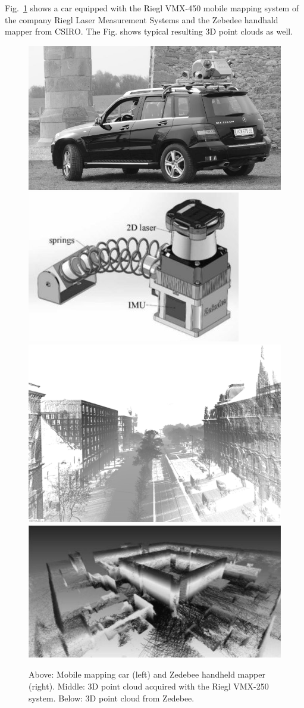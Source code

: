 \documentclass[twocolumn,oneside]{book}
\begin{document}
Fig.~\ref{fig:mm} shows a car equipped with the Riegl VMX-450 mobile
mapping system of the company Riegl Laser Measurement Systems and the
Zebedee handhald mapper from CSIRO. The Fig. shows typical resulting
3D point clouds as well.
%
\begin{figure}
  \centering
  \includegraphics[width=0.545\linewidth]{BOOKFIGS/riegl_car}
  \includegraphics[width=0.435\linewidth]{BOOKFIGS/zebedee}
  \includegraphics[width=0.95\linewidth]{BOOKFIGS/wien}
  \includegraphics[width=0.95\linewidth]{BOOKFIGS/zebedee_map}
  \caption{Above: Mobile mapping car (left) and Zedebee handheld
    mapper (right). Middle: 3D point cloud acquired with the Riegl
    VMX-250 system. Below: 3D point cloud from Zedebee.}
  \label{fig:mm}
\end{figure}
\end{document}
